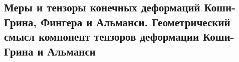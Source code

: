 

\subsection{Меры и тензоры конечных деформаций Коши-Грина, Фингера и Альманси. Геометрический смысл компонент тензоров деформации Коши-Грина и Альманси}



